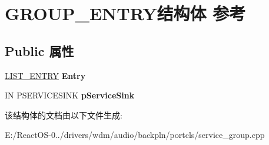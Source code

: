 \hypertarget{struct_g_r_o_u_p___e_n_t_r_y}{}\section{G\+R\+O\+U\+P\+\_\+\+E\+N\+T\+R\+Y结构体 参考}
\label{struct_g_r_o_u_p___e_n_t_r_y}
\subsection*{Public 属性}
\begin{DoxyCompactItemize}
\item 
\mbox{\label{struct_g_r_o_u_p___e_n_t_r_y_a36871db4a02ab6ca7a83ac5e4c8859b6}} 
\hyperlink{struct___l_i_s_t___e_n_t_r_y}{L\+I\+S\+T\+\_\+\+E\+N\+T\+RY} {\bfseries Entry}
\item 
\mbox{\label{struct_g_r_o_u_p___e_n_t_r_y_a3a7d53d8398e990fcb1af07b55ebe608}} 
IN P\+S\+E\+R\+V\+I\+C\+E\+S\+I\+NK {\bfseries p\+Service\+Sink}
\end{DoxyCompactItemize}


该结构体的文档由以下文件生成\+:\begin{DoxyCompactItemize}
\item 
E\+:/\+React\+O\+S-\/0../drivers/wdm/audio/backpln/portcls/service\+\_\+group.\+cpp\end{DoxyCompactItemize}
